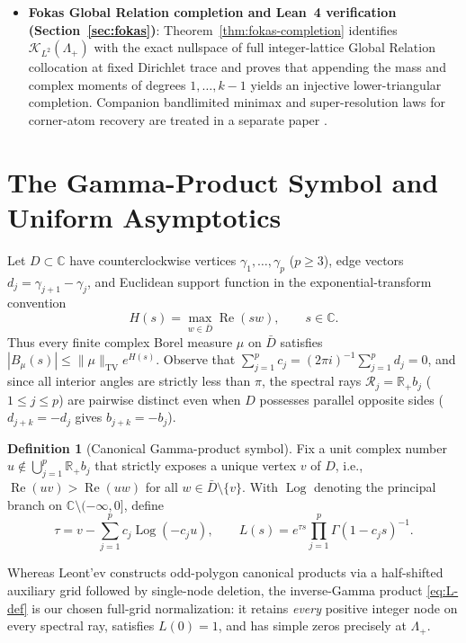 \documentclass[11pt,reqno]{amsart}
\theoremstyle{definition}
\newtheorem{definition}[theorem]{Definition}
\theoremstyle{remark}
\newcommand{\C}{\mathbb{C}}
\newcommand{\R}{\mathbb{R}}
\DeclareMathOperator{\Log}{Log}
\begin{document}
\begin{itemize}
  \item \textbf{Fokas Global Relation completion and Lean~4 verification (Section~\ref{sec:fokas})}: Theorem~\ref{thm:fokas-completion} identifies $\mathcal{K}_{L^2}(\Lambda_+)$ with the exact nullspace of full integer-lattice Global Relation collocation at fixed Dirichlet trace and proves that appending the mass and complex moments of degrees $1,\dots,k-1$ yields an injective lower-triangular completion. Companion bandlimited minimax and super-resolution laws for corner-atom recovery are treated in a separate paper \cite{Paper2}.
\end{itemize}

\section{The Gamma-Product Symbol and Uniform Asymptotics}\label{sec:symbol}

Let $D \subset \C$ have counterclockwise vertices $\gamma_1,\dots,\gamma_p$ ($p \ge 3$), edge vectors $d_j = \gamma_{j+1}-\gamma_j$, and Euclidean support function in the exponential-transform convention
\[
  H(s) = \max_{w \in \bar D} \operatorname{Re}(s w), \qquad s \in \C.
\]
Thus every finite complex Borel measure $\mu$ on $\bar D$ satisfies $|B_\mu(s)| \le \|\mu\|_{\mathrm{TV}} e^{H(s)}$. Observe that $\sum_{j=1}^p c_j = (2\pi i)^{-1}\sum_{j=1}^p d_j = 0$, and since all interior angles are strictly less than $\pi$, the spectral rays $\mathcal{R}_j = \R_+ b_j$ ($1 \le j \le p$) are pairwise distinct even when $D$ possesses parallel opposite sides ($d_{j+k} = -d_j$ gives $b_{j+k} = -b_j$).

\begin{definition}[Canonical Gamma-product symbol]\label{def:L}
Fix a unit complex number $u \notin \bigcup_{j=1}^p \R_+ b_j$ that strictly exposes a unique vertex $v$ of $D$, i.e., $\operatorname{Re}(u v) > \operatorname{Re}(u w)$ for all $w \in \bar D \setminus \{v\}$. With $\Log$ denoting the principal branch on $\C \setminus (-\infty,0]$, define
\begin{equation}\label{eq:L-def}
  \tau = v - \sum_{j=1}^p c_j \Log(-c_j u), \qquad
  L(s) = e^{\tau s} \prod_{j=1}^p \Gamma(1 - c_j s)^{-1}.
\end{equation}
\end{definition}

Whereas Leont'ev \cite{Leontev1974Polygon,Leontev1987TrMIAN} constructs odd-polygon canonical products via a half-shifted auxiliary grid followed by single-node deletion, the inverse-Gamma product \eqref{eq:L-def} is our chosen full-grid normalization: it retains \emph{every} positive integer node on every spectral ray, satisfies $L(0) = 1$, and has simple zeros precisely at $\Lambda_+$.
\end{document}
